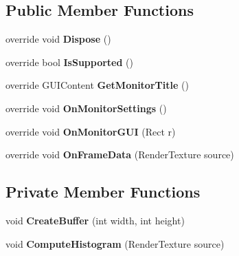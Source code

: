 \subsection*{Public Member Functions}
\begin{DoxyCompactItemize}
\item 
\mbox{\label{class_unity_editor_1_1_post_processing_1_1_histogram_monitor_a9240b5721430577251b39b7070c14ed4}} 
override void {\bfseries Dispose} ()
\item 
\mbox{\label{class_unity_editor_1_1_post_processing_1_1_histogram_monitor_a63e9ff70b84ba8443d2429359a103b02}} 
override bool {\bfseries Is\+Supported} ()
\item 
\mbox{\label{class_unity_editor_1_1_post_processing_1_1_histogram_monitor_ac727fbd3d56355c5a3b03f47ec230cb2}} 
override G\+U\+I\+Content {\bfseries Get\+Monitor\+Title} ()
\item 
\mbox{\label{class_unity_editor_1_1_post_processing_1_1_histogram_monitor_aa9ca26fe0daab044d6871dfb423bbbbf}} 
override void {\bfseries On\+Monitor\+Settings} ()
\item 
\mbox{\label{class_unity_editor_1_1_post_processing_1_1_histogram_monitor_a587ac5ca6c538b090329c9cd7dafca39}} 
override void {\bfseries On\+Monitor\+G\+UI} (Rect r)
\item 
\mbox{\label{class_unity_editor_1_1_post_processing_1_1_histogram_monitor_ae33e556cd3f2386e34562c9cda059da6}} 
override void {\bfseries On\+Frame\+Data} (Render\+Texture source)
\end{DoxyCompactItemize}
\subsection*{Private Member Functions}
\begin{DoxyCompactItemize}
\item 
\mbox{\label{class_unity_editor_1_1_post_processing_1_1_histogram_monitor_af2ca8a5aa6031a58bb583730e129f925}} 
void {\bfseries Create\+Buffer} (int width, int height)
\item 
\mbox{\label{class_unity_editor_1_1_post_processing_1_1_histogram_monitor_aa24b95dab957fda7f291e91369b07ad9}} 
void {\bfseries Compute\+Histogram} (Render\+Texture source)
\end{DoxyCompactItemize}
